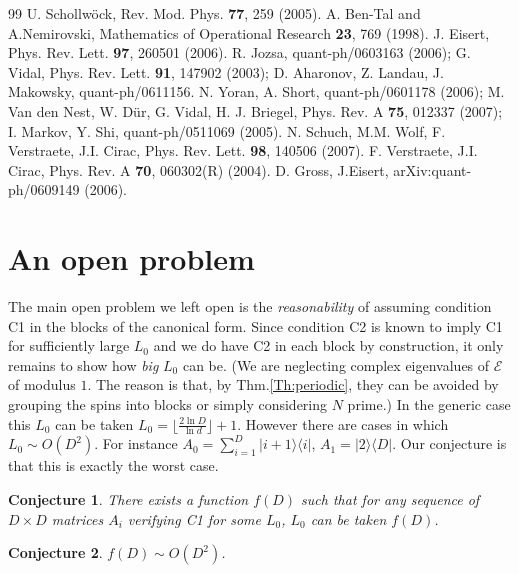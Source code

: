 \documentclass[aps,prl,epsfig,graphics,floatfix,mathbbm,a4paper]{article}
\newtheorem{conj}{\indent Conjecture}
\newcommand{\E}{\mathcal{E}}
\newcommand{\1}{\mathbbm{1}}
\renewcommand{\>}{\rangle}
\newcommand{\<}{\langle}
\begin{document}
\begin{thebibliography}{99}
     U. Schollw\"{o}ck, Rev. Mod. Phys. {\bf 77}, 259 (2005).
      A. Ben-Tal and A.Nemirovski, Mathematics of Operational Research {\bf 23}, 769 (1998).
     J. Eisert, Phys. Rev. Lett. {\bf 97}, 260501
    (2006).
     R. Jozsa, quant-ph/0603163 (2006); G. Vidal, Phys. Rev. Lett. {\bf 91},
    147902 (2003); D. Aharonov, Z. Landau, J. Makowsky,
    quant-ph/0611156.
     N. Yoran, A. Short, quant-ph/0601178 (2006); M. Van den Nest, W. D\"{u}r, G. Vidal, H. J. Briegel,
    Phys. Rev. A {\bf 75}, 012337 (2007); I. Markov, Y. Shi,
    quant-ph/0511069 (2005).
     N. Schuch, M.M. Wolf, F. Verstraete, J.I. Cirac, Phys. Rev. Lett. {\bf 98}, 140506
    (2007).
     F. Verstraete, J.I. Cirac, Phys. Rev. A {\bf
            70}, 060302(R) (2004).
     D. Gross, J.Eisert, arXiv:quant-ph/0609149
    (2006).

\end{thebibliography}


\appendix

\section{An open problem}\label{open.problems}

The main open problem we left open is the {\it reasonability} of
assuming condition C1 in the blocks of the canonical form. Since
condition C2 is known to imply C1 for sufficiently large $L_0$
\cite{FaNaWe92} and we do have C2 in each block by construction,
it only remains to show how {\it big} $L_0$ can be. (We are
neglecting complex eigenvalues of $\E$ of modulus $1$. The reason
is that, by Thm.\ref{Th:periodic}, they can be avoided by grouping
the spins into blocks or simply considering $N$ prime.) In the
generic case this $L_0$ can be taken
$L_0=\lfloor\frac{2\ln{D}}{\ln{d}}\rfloor+1$. However there are
cases in which $L_0\sim O(D^2)$. For instance
$A_0=\sum_{i=1}^D|i+1\>\<i|$, $A_1=|2\>\<D|$. Our conjecture is
that this is exactly the worst case.

\begin{conj}\label{Conj1}
    There exists a function $f(D)$ such that for any sequence of
    $D\times D$ matrices $A_i$ verifying C1 for some $L_0$, $L_0$ can
    be taken $f(D)$.
\end{conj}

\begin{conj}\label{Conj2}
    $f(D)\sim O(D^2)$.
\end{conj}
\end{document}
